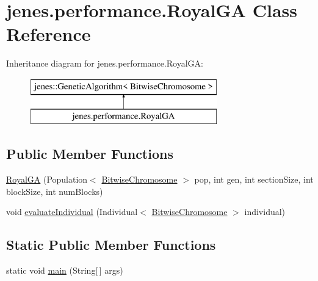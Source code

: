 \hypertarget{classjenes_1_1performance_1_1_royal_g_a}{\section{jenes.\-performance.\-Royal\-G\-A Class Reference}
\label{classjenes_1_1performance_1_1_royal_g_a}
}
Inheritance diagram for jenes.\-performance.\-Royal\-G\-A\-:\begin{figure}[H]
\begin{center}
\leavevmode
\includegraphics[height=2.000000cm]{classjenes_1_1performance_1_1_royal_g_a}
\end{center}
\end{figure}
\subsection*{Public Member Functions}
\begin{DoxyCompactItemize}
\item 
\hyperlink{classjenes_1_1performance_1_1_royal_g_a_a6e77c8bfb3b7851b2e78dc907038d557}{Royal\-G\-A} (Population$<$ \hyperlink{classjenes_1_1chromosome_1_1_bitwise_chromosome}{Bitwise\-Chromosome} $>$ pop, int gen, int section\-Size, int block\-Size, int num\-Blocks)
\item 
void \hyperlink{classjenes_1_1performance_1_1_royal_g_a_ad135a4f53db8dcf6972681a8a1ab6f43}{evaluate\-Individual} (Individual$<$ \hyperlink{classjenes_1_1chromosome_1_1_bitwise_chromosome}{Bitwise\-Chromosome} $>$ individual)
\end{DoxyCompactItemize}
\subsection*{Static Public Member Functions}
\begin{DoxyCompactItemize}
\item 
static void \hyperlink{classjenes_1_1performance_1_1_royal_g_a_a594d9cdab2d9779ea59a67bf67c47e7d}{main} (String\mbox{[}$\,$\mbox{]} args)
\end{DoxyCompactItemize}
